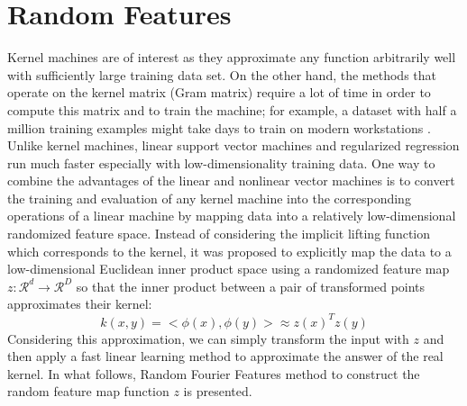 \section{Random Features}
Kernel machines are of interest as they approximate any function arbitrarily well with sufficiently large training data set. On the other hand, the methods that operate on the kernel matrix (Gram matrix) require a lot of time in order to compute this matrix and to train the machine; for example, a dataset with half a million training examples might take days to train on modern workstations \citep{rahimi2008random}.
Unlike kernel machines, linear support vector machines and regularized regression run much faster especially with low-dimensionality training data. 
One way to combine the advantages of the linear and nonlinear vector machines is to convert the training and evaluation of any kernel machine into the corresponding operations of a linear machine by mapping data into a relatively low-dimensional randomized feature space.
Instead of considering the implicit lifting function which corresponds to the kernel, it was proposed to explicitly map the data to a low-dimensional Euclidean inner product space using a randomized feature map $z:\mathcal{R}^d \xrightarrow{}\mathcal{R}^D$ so that the inner product between a pair of transformed points approximates their kernel:
\begin{equation}
\label{eq:approx_RF}
k(x,y)=<\phi(x),\phi(y)> \approx z(x)^Tz(y)
\end{equation}
Considering this approximation, we can simply transform the input with $z$ and then apply a fast linear learning method to approximate the answer of the real kernel. \newline
In what follows, Random Fourier Features method to construct the random feature map function $z$ is presented.


